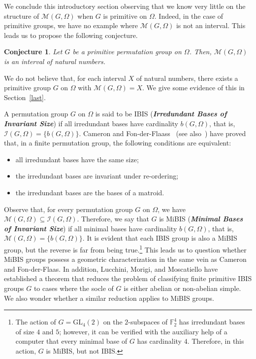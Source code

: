 \documentclass{amsart}
\newtheorem{conjecture}[theorem]{Conjecture}
\begin{document}
	We conclude this introductory section observing that we know very little on the structure of $\mathcal{M}(G,\Omega)$ when $G$ is primitive on $\Omega$. 
	Indeed, in the case of primitive groups, we have no example where $\mathcal{M}(G,\Omega)$ is not an interval. This leads us to propose the following conjecture.
	\begin{conjecture}\label{conj2}
		Let $G$ be a primitive permutation group on $\Omega$. Then, $\mathcal{M}(G,\Omega)$ is an interval of natural numbers.
	\end{conjecture}
We do not believe that, for each interval $X$ of natural numbers, there exists a primitive group $G$ on $\Omega$ with $\mathcal{M}(G,\Omega)=X$. We give some evidence of this in Section~\ref{last}. 
	
A permutation group $G$ on $\Omega$ is said to be IBIS (\textit{\textbf{Irredundant Bases of Invariant Size}}) if all irredundant bases have cardinality $b(G,\Omega)$, that is, $\mathcal{I}(G,\Omega)=\{b(G,\Omega)\}$. Cameron and Fon-der-Flaass~\cite{CF} (see also~\cite[Section~4.14]{Peter}) have proved that, in a finite permutation group, the following conditions are equivalent:
\begin{itemize}
\item all irredundant bases have the same size;
\item the irredundant bases are invariant under re-ordering;
\item the irredundant bases are the bases of a matroid.
\end{itemize}	
Observe that, for every permutation group $G$ on $\Omega$, we have $\mathcal{M}(G,\Omega)\subseteq\mathcal{I}(G,\Omega)$. Therefore, we say that $G$ is MiBIS (\textit{\textbf{Minimal Bases of Invariant Size}}) if all minimal bases have cardinality $b(G,\Omega)$, that is, $\mathcal{M}(G,\Omega)=\{b(G,\Omega)\}$. It is evident that each IBIS group is also a MiBIS group, but the reverse is far from being true.\footnote{The action of $G = \mathrm{GL}_4 (2)$ on the $2$-subspaces of $\mathbb{F}_2^4$  has irredundant bases of size $4$ and $5$; however,
it can be verified with the auxiliary help of a computer that every minimal base of
$G$ has cardinality $4$. Therefore, in this action, $G$ is MiBIS, but not IBIS.} This leads us to question whether MiBIS groups possess a geometric characterization in the same vein as Cameron and Fon-der-Flaas. In addition, Lucchini, Morigi, and Moscatiello have established a theorem that reduces the problem of classifying finite primitive IBIS groups $G$ to cases where the socle of $G$ is either abelian or non-abelian simple. We also wonder whether a similar reduction applies to MiBIS groups.
\end{document}
